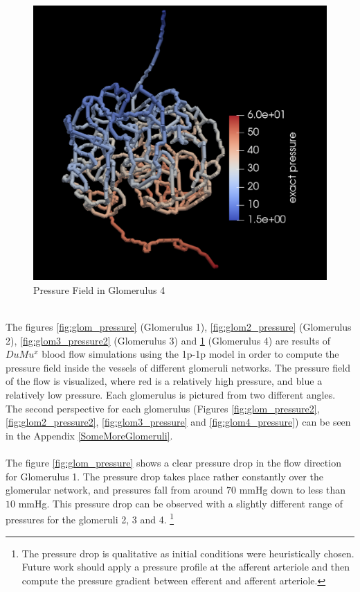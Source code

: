 \begin{figure}[h]
\centering
\includegraphics[width=162mm]{glom4_pressure2}
\caption{Pressure Field in Glomerulus 4}
\label{fig:glom4_pressure2}
\end{figure}\\
The figures \ref{fig:glom_pressure} (Glomerulus 1),  \ref{fig:glom2_pressure} (Glomerulus 2), \ref{fig:glom3_pressure2} (Glomerulus 3) and \ref{fig:glom4_pressure2} (Glomerulus 4) are results of $DuMu^x$ blood flow simulations using the 1p-1p model in order to compute the pressure field inside the vessels of different glomeruli networks. The pressure field of the flow is visualized, where red is a relatively high pressure, and blue a relatively low pressure. Each glomerulus is pictured from two different angles. The second perspective for each glomerulus (Figures \ref{fig:glom_pressure2}, \ref{fig:glom2_pressure2}, \ref{fig:glom3_pressure} and \ref{fig:glom4_pressure}) can be seen in the Appendix \ref{SomeMoreGlomeruli}.\\
\\The figure \ref{fig:glom_pressure} shows a clear pressure drop in the flow direction for Glomerulus 1. The pressure drop takes place rather constantly over the glomerular network, and pressures fall from around $70$ mmHg down to less than $10$ mmHg. This pressure drop can be observed with a slightly different range of pressures for the glomeruli 2, 3 and 4. \footnote{The
pressure drop is qualitative as initial conditions were heuristically chosen.
Future work should apply a pressure profile at the afferent arteriole and then
compute the pressure gradient between efferent and afferent arteriole.}
